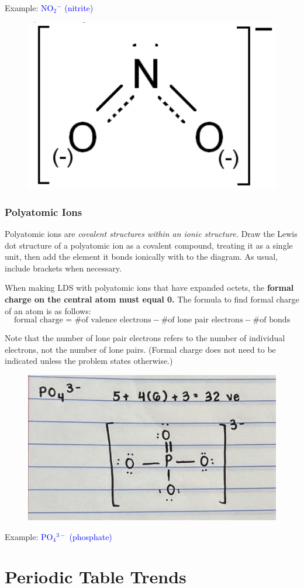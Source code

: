 \documentclass[a4paper, 12pt]{article}
\begin{document}
Example: \textcolor{blue}{NO$_2$$^-$ (nitrite)}

\begin{figure}[H]
    \centering
    \includegraphics[width=0.3\linewidth]{combinedresonance.png}
    \label{fig:something???}
\end{figure}

\subsubsection{Polyatomic Ions}
Polyatomic ions are \textit{covalent structures within an ionic structure.} Draw the Lewis dot structure of a polyatomic ion as a covalent compound, treating it as a single unit, then add the element it bonds ionically with to the diagram. As usual, include brackets when necessary.

When making LDS with polyatomic ions that have expanded octets, the \textbf{formal charge on the central atom must equal 0.} The formula to find formal charge of an atom is as follows: 
 $$ \text{formal charge = \# of valence electrons} - \text{\# of lone pair electrons} - \text{\# of bonds} $$

\noindent Note that the number of lone pair electrons refers to the number of individual electrons, not the number of lone pairs. (Formal charge does not need to be indicated unless the problem states otherwise.)

\begin{figure}[H]
    \centering
    \includegraphics[width=0.5\linewidth]{expandedlds.jpeg}
    \label{fig:bunnies are cute}
\end{figure}
\noindent Example: \textcolor{blue}{PO$_4$$^{3-}$ (phosphate)}

\section{Periodic Table Trends}
\end{document}
